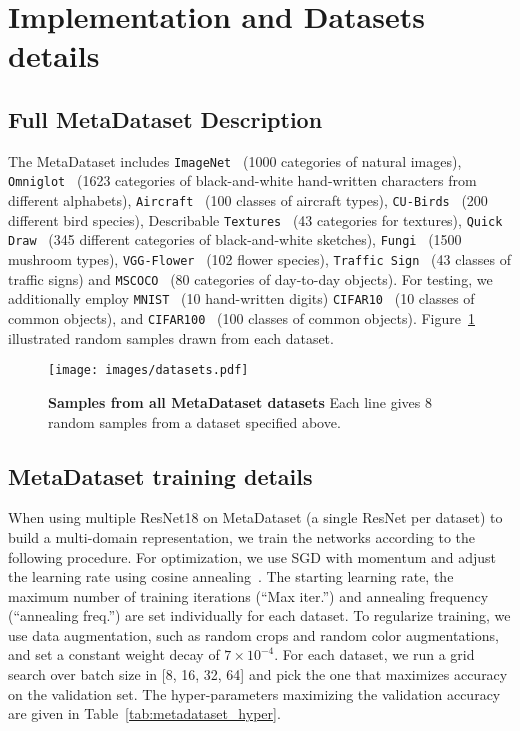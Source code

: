 \documentclass[runningheads]{llncs}
\begin{document}
\appendix
\section{Implementation and Datasets details}
\subsection{Full MetaDataset Description}
The MetaDataset includes
\texttt{ImageNet}~\cite{imagenet} (1000 categories of natural images),
\texttt{Omniglot}~\cite{lake2015human} (1623 categories of black-and-white
hand-written characters from different alphabets),
\texttt{Aircraft}~\cite{maji13fine-grained} (100 classes of aircraft types),
\texttt{CU-Birds}~\cite{wah2011caltech} (200 different bird species),
Describable \texttt{Textures}~\cite{cimpoi2014describing} (43 categories for
textures), \texttt{Quick Draw}~\cite{quickdraw} (345 different categories of
black-and-white sketches), \texttt{Fungi}~\cite{fungi} (1500 mushroom
types), \texttt{VGG-Flower}~\cite{nilsback2008automated} (102
flower species), \texttt{Traffic Sign}~\cite{houben2013detection} (43 classes of
traffic signs) and \texttt{MSCOCO}~\cite{coco} (80 categories of day-to-day
objects). For testing, we additionally employ \texttt{MNIST}~\cite{mnist} (10
hand-written digits)
\texttt{CIFAR10}~\cite{krizhevsky2009learning} (10 classes of common objects), and
\texttt{CIFAR100}~\cite{krizhevsky2009learning} (100 classes of common objects).
Figure~\ref{fig:datasets} illustrated random samples drawn from each dataset.

\begin{figure}[th!]
   \centering
  \texttt{[image: images/datasets.pdf]}
\caption{\textbf{Samples from all MetaDataset datasets} Each line gives 8 random
samples from a dataset specified above.}\label{fig:datasets}
\end{figure}


\subsection{MetaDataset training details}
When using multiple ResNet18 on MetaDataset (a single ResNet per dataset) to
build a multi-domain representation, we train the networks according to the
following procedure.
For optimization, we use SGD with momentum and adjust the learning rate using
cosine annealing~\cite{loshchilov2016sgdr}. The starting learning rate, the maximum number of
training iterations (``Max iter.'') and annealing frequency (``annealing
freq.'') are set individually for each dataset. To regularize training, we use
data augmentation, such as random crops and random color augmentations, and set
a constant weight decay of $7 \times 10^{-4}$. For each dataset, we run a grid
search over batch size in [8, 16, 32, 64] and pick the one that maximizes
accuracy on the validation set. The hyper-parameters maximizing the validation
accuracy are given in Table~\ref{tab:metadataset_hyper}.
\end{document}
